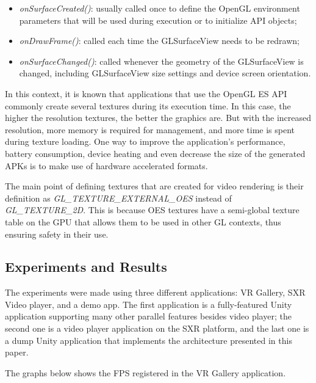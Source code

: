 \documentclass[runningheads]{llncs}
\begin{document}
\begin{itemize}
    \item \textit{onSurfaceCreated()}: usually called once to define the OpenGL environment parameters that will be used during execution or to initialize API objects;
    \item \textit{onDrawFrame()}: called each time the GLSurfaceView needs to be redrawn;
    \item \textit{onSurfaceChanged()}: called whenever the geometry of the GLSurfaceView is changed, including GLSurfaceView size settings and device screen orientation.
\end{itemize}

In this context, it is known that applications that use the OpenGL ES API commonly create several textures during its execution time. In this case, the higher the resolution textures, the better the graphics are. But with the increased resolution,  more memory is required for management, and more time is spent during texture loading. One way to improve the application's performance, battery consumption, device heating and even decrease the size of the generated APKs is to make use of hardware accelerated formats.

The main point of defining textures that are created for video rendering is their definition as \textit{GL\_TEXTURE\_EXTERNAL\_OES} instead of \textit{GL\_TEXTURE\_2D}. This is because OES textures have a semi-global texture table on the GPU that allows them to be used in other GL contexts, thus ensuring safety in their use.

\subsection{Experiments and Results} \label{experiments}
The experiments were made using three different applications: VR Gallery, SXR Video player, and a demo app. The first application is a fully-featured Unity application supporting many other parallel features besides video player; the second one is a video player application on the SXR platform, and the last one is a dump Unity application that implements the architecture presented in this paper.

The graphs below shows the FPS registered in the VR Gallery application.
\end{document}

